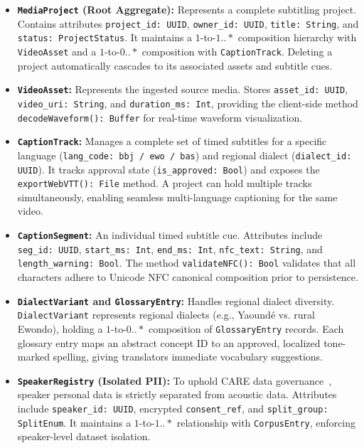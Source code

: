 \documentclass[a4paper,11pt]{article}
\begin{document}
\begin{itemize}
    \item \textbf{\texttt{MediaProject} (Root Aggregate):} Represents a complete subtitling project. Contains attributes \texttt{project\_id: UUID}, \texttt{owner\_id: UUID}, \texttt{title: String}, and \texttt{status: ProjectStatus}. It maintains a $1$-to-$1..*$ composition hierarchy with \texttt{VideoAsset} and a $1$-to-$0..*$ composition with \texttt{CaptionTrack}. Deleting a project automatically cascades to its associated assets and subtitle cues.
    \item \textbf{\texttt{VideoAsset}:} Represents the ingested source media. Stores \texttt{asset\_id: UUID}, \texttt{video\_uri: String}, and \texttt{duration\_ms: Int}, providing the client-side method \texttt{decodeWaveform(): Buffer} for real-time waveform visualization.
    \item \textbf{\texttt{CaptionTrack}:} Manages a complete set of timed subtitles for a specific language (\texttt{lang\_code: bbj / ewo / bas}) and regional dialect (\texttt{dialect\_id: UUID}). It tracks approval state (\texttt{is\_approved: Bool}) and exposes the \texttt{exportWebVTT(): File} method. A project can hold multiple tracks simultaneously, enabling seamless multi-language captioning for the same video.
    \item \textbf{\texttt{CaptionSegment}:} An individual timed subtitle cue. Attributes include \texttt{seg\_id: UUID}, \texttt{start\_ms: Int}, \texttt{end\_ms: Int}, \texttt{nfc\_text: String}, and \texttt{length\_warning: Bool}. The method \texttt{validateNFC(): Bool} validates that all characters adhere to Unicode NFC canonical composition prior to persistence.
    \item \textbf{\texttt{DialectVariant} and \texttt{GlossaryEntry}:} Handles regional dialect diversity. \texttt{DialectVariant} represents regional dialects (e.g., Yaound\'e vs. rural Ewondo), holding a $1$-to-$0..*$ composition of \texttt{GlossaryEntry} records. Each glossary entry maps an abstract concept ID to an approved, localized tone-marked spelling, giving translators immediate vocabulary suggestions.
    \item \textbf{\texttt{SpeakerRegistry} (Isolated PII):} To uphold CARE data governance~\cite{carroll2020care}, speaker personal data is strictly separated from acoustic data. Attributes include \texttt{speaker\_id: UUID}, encrypted \texttt{consent\_ref}, and \texttt{split\_group: SplitEnum}. It maintains a $1$-to-$1..*$ relationship with \texttt{CorpusEntry}, enforcing speaker-level dataset isolation.

\end{itemize}
\end{document}
